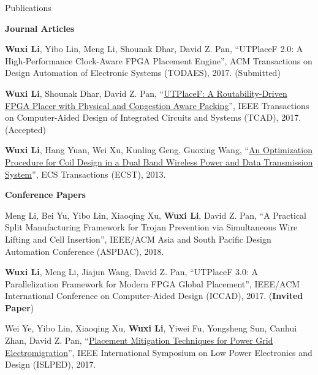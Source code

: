 \begin{rSection}{Publications}

\textbf{Journal Articles}
\begin{description}[font=\normalfont]
\item[{[J3]}]{
    \textbf{Wuxi Li}, Yibo Lin, Meng Li, Shounak Dhar, David Z. Pan,
    ``UTPlaceF 2.0: A High-Performance Clock-Aware FPGA Placement Engine'',
    ACM Transactions on Design Automation of Electronic Systems (TODAES), 2017.
    (Submitted)
}

\item[{[J2]}]{
    \textbf{Wuxi Li}, Shounak Dhar, David Z. Pan,
    ``\href{http://ieeexplore.ieee.org/document/7984833/}{UTPlaceF: A Routability-Driven FPGA Placer with Physical and Congestion Aware Packing}'',
    IEEE Transactions on Computer-Aided Design of Integrated Circuits and Systems (TCAD), 2017.
    (Accepted)
}

\item[{[J1]}]{
    \textbf{Wuxi Li}, Hang Yuan, Wei Xu, Kunling Geng, Guoxing Wang,
    ``\href{http://ecst.ecsdl.org/content/52/1/1091.short}{An Optimization Procedure for Coil Design in a Dual Band Wireless Power and Data Transmission System}'',
    ECS Transactions (ECST), 2013.
}

\end{description}

\textbf{Conference Papers}
\begin{description}[font=\normalfont]
\item[{[C5]}]{
    Meng Li, Bei Yu, Yibo Lin, Xiaoqing Xu, \textbf{Wuxi Li}, David Z. Pan,
    ``A Practical Split Manufacturing Framework for Trojan Prevention via Simultaneous Wire Lifting and Cell Insertion'',
    IEEE/ACM Asia and South Pacific Design Automation Conference (ASPDAC), 2018.
}

\item[{[C4]}]{
    \textbf{Wuxi Li}, Meng Li, Jiajun Wang, David Z. Pan,
    ``UTPlaceF 3.0: A Parallelization Framework for Modern FPGA Global Placement'',
    IEEE/ACM International Conference on Computer-Aided Design (ICCAD), 2017.
    (\textbf{Invited Paper})
}

\item[{[C3]}]{
    Wei Ye, Yibo Lin, Xiaoqing Xu, \textbf{Wuxi Li}, Yiwei Fu, Yongsheng Sun, Canhui Zhan, David Z. Pan,
    ``\href{http://ieeexplore.ieee.org/document/8009178/}{Placement Mitigation Techniques for Power Grid Electromigration}'',
    IEEE International Symposium on Low Power Electronics and Design (ISLPED), 2017.
}


\end{description}
\end{rSection}

